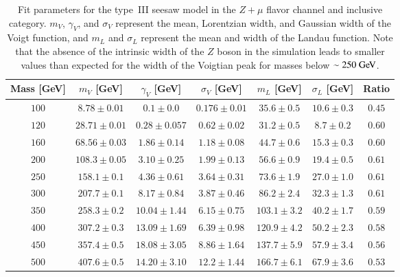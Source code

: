 \begin{appendices}
\begin{table}[h]
 \centering
\scriptsize
 \begin{tabular}{|c||c|c|c|c|c|c|}  
 \hline\hline
Mass [GeV] & $m_V$ [GeV] &  $\gamma_V$ [GeV] &  $\sigma_V$ [GeV] & $m_L$  [GeV] & $\sigma_L$ [GeV] & Ratio\\
\hline \hline
$100$&$8.78\pm0.01 $&$ 0.1\pm0.0$&$ 0.176\pm0.01 $&$ 35.6\pm0.5 $&$ 10.6\pm0.3 $&$0.45 $\\ 
$120$&$28.71\pm0.01 $&$ 0.28\pm0.057 $&$ 0.62\pm0.02 $&$ 31.2\pm0.5 $&$ 8.7\pm0.2 $&$0.60 $\\ 
$160$&$68.56\pm0.03 $&$ 1.86\pm0.14$&$ 1.18\pm0.08 $&$ 44.7\pm0.6 $&$ 15.3\pm0.3 $&$0.60 $\\ 
$200$&$108.3\pm0.05 $&$ 3.10\pm0.25 $&$ 1.99\pm0.13 $&$ 56.6\pm0.9 $&$ 19.4\pm0.5 $&$0.61$\\ 
$250$&$158.1\pm0.1 $&$ 4.36\pm0.61 $&$ 3.64\pm0.31 $&$ 73.6\pm1.9 $&$ 27.0\pm1.0 $&$0.61 $\\ 
$300$&$207.7\pm0.1 $&$ 8.17\pm0.84 $&$ 3.87\pm0.46 $&$ 86.2\pm2.4 $&$ 32.3\pm1.3 $&$0.61$ \\ 
$350$&$258.3\pm0.2 $&$ 10.04\pm1.44 $&$ 6.15\pm0.75 $&$ 103.1\pm3.2 $&$ 40.2\pm1.7 $&$0.59 $\\ 
$400$&$307.2\pm0.3 $&$ 13.09\pm1.69 $&$ 6.39\pm0.98 $&$ 120.9\pm4.2 $&$ 50.2\pm2.3 $&$0.58$ \\ 
$450$&$357.4\pm0.5 $&$ 18.08\pm3.05 $&$ 8.86\pm1.64 $&$ 137.7\pm5.9 $&$ 57.9\pm3.4 $&$0.56$ \\ 
$500$&$407.6\pm0.5 $&$ 14.20\pm3.10 $&$ 12.2\pm1.44 $&$ 166.7\pm6.1 $&$ 67.9\pm3.6 $&$0.53 $\\ 
\hline\hline
\end{tabular} 
\caption{Fit parameters for the type~III seesaw model in the $Z+\mu$ flavor channel and inclusive category. $m_V$, $\gamma_V$, and $\sigma_V$ represent the mean, Lorentzian width, and Gaussian width of the Voigt function, and $m_L$ and $\sigma_L$ represent the mean and width of the Landau function. Note that the absence of the intrinsic width of the $Z$ boson in the simulation leads to smaller values than expected for the width of the Voigtian peak for masses below $\sim250 \GeV$.}
   \label{table:ZmuFitParamsSS}
\end{table}



\end{appendices}
